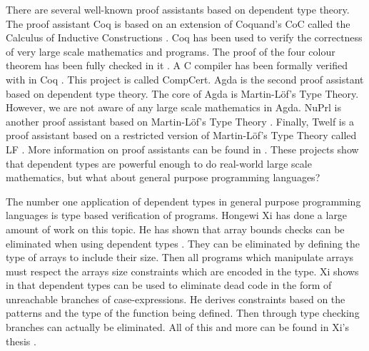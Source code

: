 There are several well-known proof assistants based on dependent type
theory.  The proof assistant Coq is based on an extension of Coquand's
CoC called the Calculus of Inductive Constructions
\cite{CoqRefMan:2008}.  Coq has been used to verify the correctness of
very large scale mathematics and programs.  The proof of the four
colour theorem has been fully checked in it \cite{Gonthier:2005}.  A C
compiler has been formally verified with in Coq
\cite{Leroy:2009,Leroy:2006}.  This project is called CompCert.  Agda
is the second proof assistant based on dependent type theory.  The
core of Agda is Martin-L\"of's Type Theory.  However, we are not aware
of any large scale mathematics in Agda.  NuPrl is another proof
assistant based on Martin-L\"of's Type Theory \cite{Constable:1986}.
Finally, Twelf is a proof assistant based on a restricted version of
Martin-L\"of's Type Theory called LF \cite{Pfenning:1999}.  More
information on proof assistants can be found in \cite{Geuvers:2009}.
These projects show that dependent types are powerful enough to do
real-world large scale mathematics, but what about general purpose
programming languages?

The number one application of dependent types in general purpose
programming languages is type based verification of programs.  Hongewi
Xi has done a large amount of work on this topic.  He has shown that
array bounds checks can be eliminated when using dependent types
\cite{Xi:1998}.  They can be eliminated by defining the type of arrays
to include their size.  Then all programs which manipulate arrays must
respect the arrays size constraints which are encoded in the type.  Xi
shows in \cite{Xi:1999c} that dependent types can be used to eliminate
dead code in the form of unreachable branches of case-expressions.  He
derives constraints based on the patterns and the type of the function
being defined.  Then through type checking branches can actually be
eliminated.  All of this and more can be found in Xi's thesis
\cite{Xi:1999a}.  

